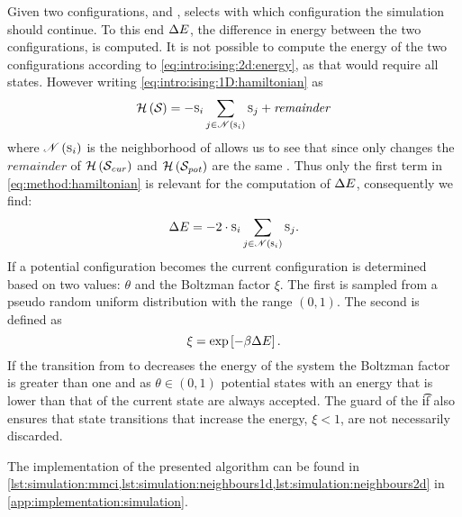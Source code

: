 Given two configurations,  and ,  selects with which configuration the simulation should continue. To this end $\Delta E$, the difference in energy between the two configurations, is computed. It is not possible to compute the energy of the two configurations according to \cref{eq:intro:ising:2d:energy}, as that would require all states. However writing \cref{eq:intro:ising:1D:hamiltonian} as
	\begin{equation}\label{eq:method:hamiltonian}
			\mathcal{H}\left(\mathcal{S}_{}\right) = - \textsc{s}_{i} \sum_{j \in \mathscr{N}\left(\textsc{s}_{i}\right)} \textsc{s}_{j} + \mathit{remainder}
	\end{equation}
where $\mathscr{N}\left(\textsc{s}_{i}\right)$ is the neighborhood of  allows us to see that since only  changes the $\mathit{remainder}$ of $\mathcal{H}\left(\mathcal{S}_{\mathit{cur}}\right)$ and $\mathcal{H}\left(\mathcal{S}_{\mathit{pot}}\right)$ are the same \cite{kenzel1997physics}. Thus only the first term in \cref{eq:method:hamiltonian} is relevant for the computation of $\Delta E$, consequently we find:
\begin{equation}\label{eq:method:deltaEnergy}
	\Delta E = - 2 \cdot \textsc{s}_{i} \sum_{j \in \mathscr{N}\left(\textsc{s}_{i}\right)} \textsc{s}_{j}.
\end{equation}
If a potential configuration becomes the current configuration is determined based on  two values: $\theta$ and the Boltzman factor $\xi$. The first is sampled from a pseudo random uniform distribution with the range $\left(0, 1\right)$. The second is defined as
\begin{equation}
	\xi = \exp\left[- \beta\Delta E \right].
\end{equation}
If the transition from  to  decreases the energy of the system the Boltzman factor is greater than one and as \mbox{$\theta \in \left(0, 1\right)$} potential states with an energy that is lower than that of the current state are always accepted. The guard of the \t{if} also ensures that state transitions that increase the energy, \ie \mbox{$\xi < 1$}, are not necessarily discarded.

The implementation of the presented algorithm can be found in \cref{lst:simulation:mmci,lst:simulation:neighbours1d,lst:simulation:neighbours2d} in \cref{app:implementation:simulation}.